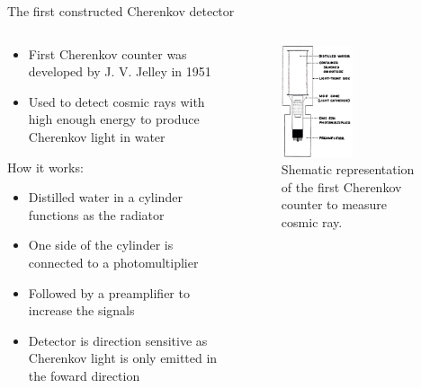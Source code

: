 \documentclass[aspectratio=1610, 10pt]{beamer}
\begin{document}
\begin{frame}{The first constructed Cherenkov detector}
  \begin{columns}
  \begin{column}{0.5\textwidth}
  \begin{itemize}
    \item First Cherenkov counter was developed by J. V. Jelley in 1951
    \medskip
    \item Used to detect cosmic rays with high enough energy to produce Cherenkov light in water
    \medskip \\
  \end{itemize}
\vspace{0.5cm}
How it works:
  \begin{itemize}
    \item Distilled water in a cylinder functions as the radiator

    \item One side of the cylinder is connected to a photomultiplier
    \medskip
    \item Followed by a preamplifier to increase the signals
    \medskip
    \item Detector is direction sensitive as Cherenkov light is only emitted in the foward direction
  \end{itemize}
  \end{column}
  \begin{column}{0.5\textwidth}
    \begin{figure}
      \includegraphics[width=0.5\textwidth]{images/the_first.png}
      \caption{Shematic representation of the first Cherenkov counter to measure cosmic ray. \cite{gaseous}}
    \end{figure}
  \end{column}
  \end{columns}
\end{frame}
\end{document}
